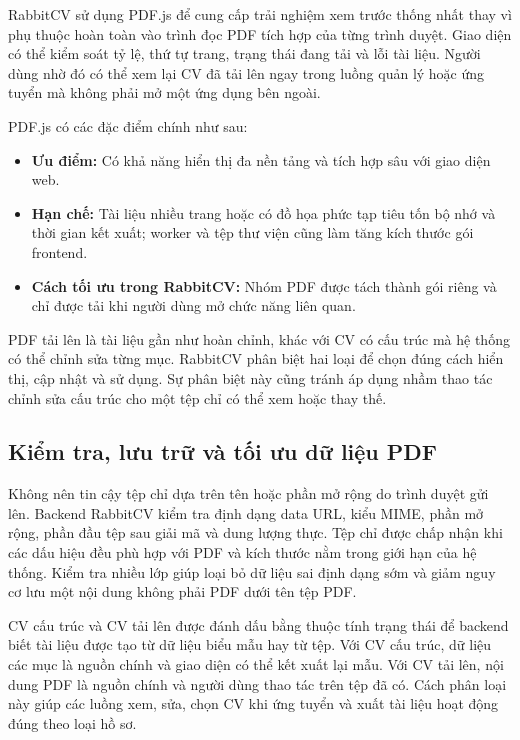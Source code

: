 RabbitCV sử dụng PDF.js để cung cấp trải nghiệm xem trước thống nhất thay vì phụ thuộc hoàn toàn vào trình đọc PDF tích hợp của từng trình duyệt. Giao diện có thể kiểm soát tỷ lệ, thứ tự trang, trạng thái đang tải và lỗi tài liệu. Người dùng nhờ đó có thể xem lại CV đã tải lên ngay trong luồng quản lý hoặc ứng tuyển mà không phải mở một ứng dụng bên ngoài.

PDF.js có các đặc điểm chính như sau:

\begin{itemize}
    \item \textbf{Ưu điểm:} Có khả năng hiển thị đa nền tảng và tích hợp sâu với giao diện web.
    \item \textbf{Hạn chế:} Tài liệu nhiều trang hoặc có đồ họa phức tạp tiêu tốn bộ nhớ và thời gian kết xuất; worker và tệp thư viện cũng làm tăng kích thước gói frontend.
    \item \textbf{Cách tối ưu trong RabbitCV:} Nhóm PDF được tách thành gói riêng và chỉ được tải khi người dùng mở chức năng liên quan.
\end{itemize}

PDF tải lên là tài liệu gần như hoàn chỉnh, khác với CV có cấu trúc mà hệ thống có thể chỉnh sửa từng mục. RabbitCV phân biệt hai loại để chọn đúng cách hiển thị, cập nhật và sử dụng. Sự phân biệt này cũng tránh áp dụng nhầm thao tác chỉnh sửa cấu trúc cho một tệp chỉ có thể xem hoặc thay thế.

\subsection{Kiểm tra, lưu trữ và tối ưu dữ liệu PDF}

Không nên tin cậy tệp chỉ dựa trên tên hoặc phần mở rộng do trình duyệt gửi lên. Backend RabbitCV kiểm tra định dạng data URL, kiểu MIME, phần mở rộng, phần đầu tệp sau giải mã và dung lượng thực. Tệp chỉ được chấp nhận khi các dấu hiệu đều phù hợp với PDF và kích thước nằm trong giới hạn của hệ thống. Kiểm tra nhiều lớp giúp loại bỏ dữ liệu sai định dạng sớm và giảm nguy cơ lưu một nội dung không phải PDF dưới tên tệp PDF.

CV cấu trúc và CV tải lên được đánh dấu bằng thuộc tính trạng thái để backend biết tài liệu được tạo từ dữ liệu biểu mẫu hay từ tệp. Với CV cấu trúc, dữ liệu các mục là nguồn chính và giao diện có thể kết xuất lại mẫu. Với CV tải lên, nội dung PDF là nguồn chính và người dùng thao tác trên tệp đã có. Cách phân loại này giúp các luồng xem, sửa, chọn CV khi ứng tuyển và xuất tài liệu hoạt động đúng theo loại hồ sơ.

